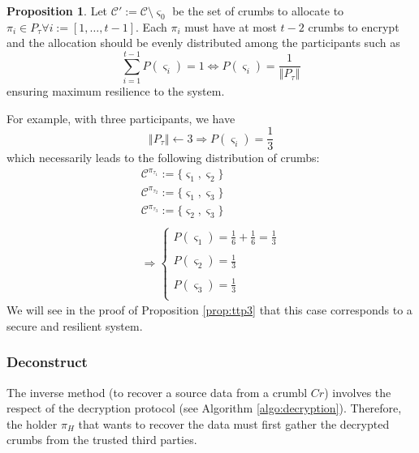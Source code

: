 \documentclass[twoside,twocolumn]{article}
\newcommand{\norm}[1]{\left\Vert#1\right\Vert}
\theoremstyle{definition}
\newtheorem{proposition}{Proposition}
\theoremstyle{remark}
\begin{document}
\begin{proposition}
    \label{prop:allocation}
    Let $\mathcal{C}' := \mathcal{C} \setminus \varsigma_0$ be the set of crumbs to allocate to $\pi_i \in P_\tau \forall i := [1, \dots, t-1]$.
    Each $\pi_i$ must have at most $t-2$ crumbs to encrypt and the allocation should be evenly distributed among the participants such as 
    \begin{equation}
        \label{eq:allocation}
        \sum_{i=1}^{t-1} P(\varsigma_i) = 1 \iff P(\varsigma_i) = \frac{1}{\norm{P_\tau}}
    \end{equation}  
    ensuring maximum resilience to the system.

    For example, with three participants, we have $$
    \norm{P_\tau} \gets 3 \Rightarrow P(\varsigma_i) = \frac{1}{3}
    $$
    which necessarily leads to the following distribution of crumbs:$$
        \begin{array}{l}
            \mathcal{C}^{\pi_{\tau_1}} := \{ \varsigma_1, \varsigma_2 \} \\
            \mathcal{C}^{\pi_{\tau_2}} := \{ \varsigma_1, \varsigma_3 \} \\
            \mathcal{C}^{\pi_{\tau_3}} := \{ \varsigma_2, \varsigma_3 \} \\ \\
            \Rightarrow \left\{
                \begin{array}{l}
                    P(\varsigma_1) = \frac{1}{6} + \frac{1}{6} = \frac{1}{3} \\ \\
                    P(\varsigma_2) = \frac{1}{3} \\ \\
                    P(\varsigma_3) = \frac{1}{3} \\
                \end{array}
            \right.
        \end{array}
    $$
    We will see in the proof of Proposition \ref{prop:ttp3} that this case corresponds to a secure and resilient system.
\end{proposition}

\subsubsection{Deconstruct}

The inverse method (to recover a source data from a crumbl $Cr$) involves the respect of the decryption protocol (see Algorithm \ref{algo:decryption}).
Therefore, the holder $\pi_H$ that wants to recover the data must first gather the decrypted crumbs from the trusted third parties.
\end{document}
